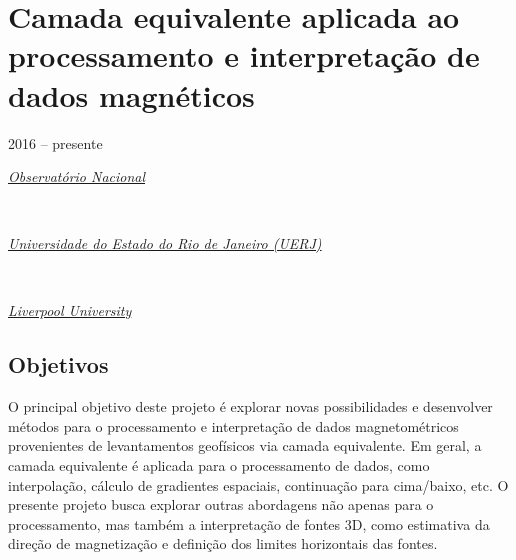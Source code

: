 \section{Camada equivalente aplicada ao processamento e interpretação de dados magnéticos} 
\label{sec:projeto-guarda-chuva-eqlayer}

2016 -- presente
\vspace{0.3\baselineskip}\\
\noindent\parbox{0.03\textwidth}{\vspace{-0.2\baselineskip}\faUniversity} \href{https://www.gov.br/observatorio/pt-br}{\textsl{Observatório Nacional}}
\parbox{0.03\textwidth}{\vspace{-0.2\baselineskip} \hfill {}} \\
\noindent\parbox{0.03\textwidth}{\vspace{-0.2\baselineskip}\faUniversity}
\href{https://www.uerj.br/}{\textsl{Universidade do Estado do Rio de Janeiro (UERJ)}}
\parbox{0.03\textwidth}{\vspace{-0.2\baselineskip} \hfill {}} \\
\noindent\parbox{0.03\textwidth}{\vspace{-0.2\baselineskip}\faUniversity}
\href{https://www.liverpool.ac.uk/}{\textsl{Liverpool University}}
\parbox{0.04\textwidth}{\vspace{-0.2\baselineskip} \hfill {}}

\subsection*{Objetivos}

O principal objetivo deste projeto é explorar novas possibilidades e desenvolver métodos
para o processamento e interpretação de dados magnetométricos provenientes de levantamentos 
geofísicos via camada equivalente. 
Em geral, a camada equivalente é aplicada para o processamento de dados, como interpolação,
cálculo de gradientes espaciais, continuação para cima/baixo, etc. O presente projeto busca 
explorar outras abordagens não apenas para o processamento, mas também a interpretação
de fontes 3D, como estimativa da direção de magnetização e definição dos limites horizontais 
das fontes.

